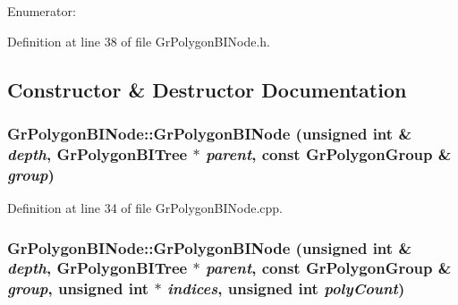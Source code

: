 \begin{CompactItemize}
\begin{Desc}
\item[Enumerator: ]\par
\begin{description}
\item[{\em 
\hypertarget{class_gr_polygon_b_i_node_1ef624ba045eb18ffd2bb7dbb16d8090f724f5c5df1ed773ce60e4df85485382}{
ES\_\-FRONT}
\label{class_gr_polygon_b_i_node_1ef624ba045eb18ffd2bb7dbb16d8090f724f5c5df1ed773ce60e4df85485382}
}]\item[{\em 
\hypertarget{class_gr_polygon_b_i_node_1ef624ba045eb18ffd2bb7dbb16d8090bd853ea225de2f66118ba5557c11a08a}{
ES\_\-BACK}
\label{class_gr_polygon_b_i_node_1ef624ba045eb18ffd2bb7dbb16d8090bd853ea225de2f66118ba5557c11a08a}
}]\end{description}
\end{Desc}



Definition at line 38 of file GrPolygonBINode.h.

\subsection{Constructor \& Destructor Documentation}
\hypertarget{class_gr_polygon_b_i_node_2b0d0ba71be948dc3a83f588bc0996ab}{
\subsubsection[{GrPolygonBINode}]{\setlength{\rightskip}{0pt plus 5cm}GrPolygonBINode::GrPolygonBINode (unsigned int \& {\em depth}, \/  {\bf GrPolygonBITree} $\ast$ {\em parent}, \/  const {\bf GrPolygonGroup} \& {\em group})}}
\label{class_gr_polygon_b_i_node_2b0d0ba71be948dc3a83f588bc0996ab}




Definition at line 34 of file GrPolygonBINode.cpp.\hypertarget{class_gr_polygon_b_i_node_0db4a41472906e2b89df7d278b5bd25c}{
\subsubsection[{GrPolygonBINode}]{\setlength{\rightskip}{0pt plus 5cm}GrPolygonBINode::GrPolygonBINode (unsigned int \& {\em depth}, \/  {\bf GrPolygonBITree} $\ast$ {\em parent}, \/  const {\bf GrPolygonGroup} \& {\em group}, \/  unsigned int $\ast$ {\em indices}, \/  unsigned int {\em polyCount})}}
\label{class_gr_polygon_b_i_node_0db4a41472906e2b89df7d278b5bd25c}





\end{CompactItemize}
